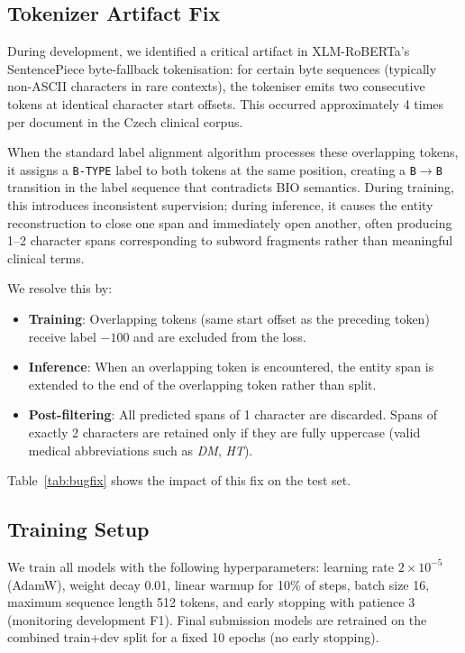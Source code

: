 \documentclass[11pt]{article}
\begin{document}
\subsection{Tokenizer Artifact Fix}

During development, we identified a critical artifact in XLM-RoBERTa's SentencePiece
byte-fallback tokenisation: for certain byte sequences (typically non-ASCII characters in
rare contexts), the tokeniser emits two consecutive tokens at identical character start
offsets. This occurred approximately 4 times per document in the Czech clinical corpus.

When the standard label alignment algorithm processes these overlapping tokens, it assigns
a \texttt{B-TYPE} label to both tokens at the same position, creating a
\texttt{B}$\to$\texttt{B} transition in the label sequence that contradicts BIO semantics.
During training, this introduces inconsistent supervision; during inference, it causes the
entity reconstruction to close one span and immediately open another, often producing 1--2
character spans corresponding to subword fragments rather than meaningful clinical terms.

We resolve this by:
\begin{itemize}
  \item \textbf{Training}: Overlapping tokens (same start offset as the preceding token)
        receive label $-100$ and are excluded from the loss.
  \item \textbf{Inference}: When an overlapping token is encountered, the entity span
        is extended to the end of the overlapping token rather than split.
  \item \textbf{Post-filtering}: All predicted spans of 1 character are discarded.
        Spans of exactly 2 characters are retained only if they are fully uppercase
        (valid medical abbreviations such as \textit{DM}, \textit{HT}).
\end{itemize}

Table~\ref{tab:bugfix} shows the impact of this fix on the test set.

\subsection{Training Setup}

We train all models with the following hyperparameters: learning rate $2 \times 10^{-5}$
(AdamW), weight decay 0.01, linear warmup for 10\% of steps, batch size 16, maximum
sequence length 512 tokens, and early stopping with patience 3 (monitoring development
F1). Final submission models are retrained on the combined train+dev split for a fixed
10 epochs (no early stopping).
\end{document}
